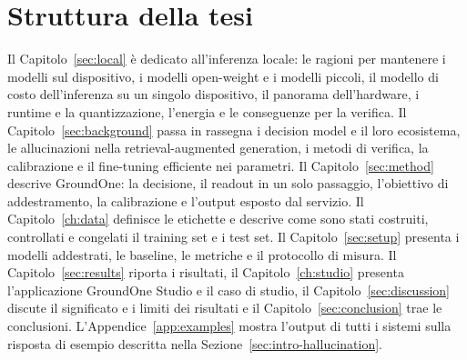 \section{Struttura della tesi}
\label{sec:intro-structure}

Il Capitolo~\ref{sec:local} è dedicato all'inferenza locale: le ragioni per mantenere i modelli sul dispositivo, i
modelli open-weight e i modelli piccoli, il modello di costo dell'inferenza su un singolo dispositivo, il panorama
dell'hardware, i runtime e la quantizzazione, l'energia e le conseguenze per la verifica. Il
Capitolo~\ref{sec:background} passa in rassegna i decision model e il loro ecosistema, le allucinazioni
nella retrieval-augmented generation, i metodi di verifica, la calibrazione e il fine-tuning efficiente nei parametri. Il Capitolo~\ref{sec:method} descrive GroundOne: la decisione, il readout in un solo passaggio, l'obiettivo di
addestramento, la calibrazione e l'output esposto dal servizio. Il Capitolo~\ref{ch:data} definisce le etichette e
descrive come sono stati costruiti, controllati e congelati il training set e i test set. Il Capitolo~\ref{sec:setup}
presenta i modelli addestrati, le baseline, le metriche e il protocollo di misura. Il Capitolo~\ref{sec:results} riporta
i risultati, il Capitolo~\ref{ch:studio} presenta l'applicazione GroundOne Studio e il caso di studio, il
Capitolo~\ref{sec:discussion} discute il significato e i limiti dei risultati e il Capitolo~\ref{sec:conclusion} trae
le conclusioni. L'Appendice~\ref{app:examples} mostra l'output di tutti i sistemi sulla risposta di esempio
descritta nella Sezione~\ref{sec:intro-hallucination}.
